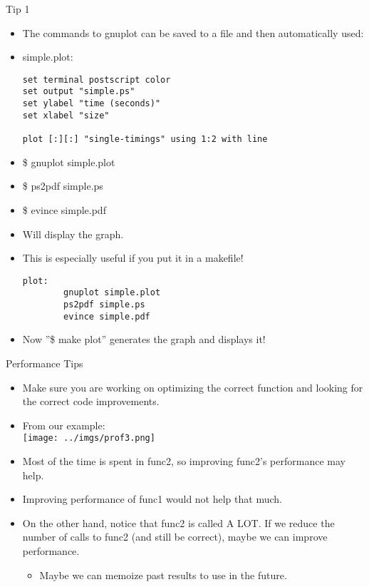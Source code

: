 \documentclass{beamer}
\begin{document}
\begin{frame}[fragile]{Tip 1}
\begin{itemize}
\item The commands to gnuplot can be saved to a file and then automatically used:
\item simple.plot:\\
\begin{lstlisting}
set terminal postscript color
set output "simple.ps"
set ylabel "time (seconds)"
set xlabel "size"

plot [:][:] "single-timings" using 1:2 with line
\end{lstlisting}
\item \$ gnuplot simple.plot
\item \$ ps2pdf simple.ps
\item \$ evince simple.pdf
\item Will display the graph.
\item This is especially useful if you put it in a makefile!
\begin{lstlisting}
plot:
        gnuplot simple.plot
        ps2pdf simple.ps
        evince simple.pdf
\end{lstlisting}
\item Now ''\$ make plot'' generates the graph and displays it!
\end{itemize}
\end{frame}

\begin{frame}{Performance Tips}
\begin{itemize}
\item Make sure you are working on optimizing the correct function and looking for the correct code improvements.
\item From our example:\\
\texttt{[image: ../imgs/prof3.png]}
\item Most of the time is spent in func2, so improving func2's performance may help.
\item Improving performance of func1 would not help that much.
\item On the other hand, notice that func2 is called A LOT.  If we reduce the number of calls to func2 (and still be correct), maybe we can improve performance.
\begin{itemize}
\item Maybe we can memoize past results to use in the future.
\end{itemize}
\end{itemize}
\end{frame}
\end{document}
